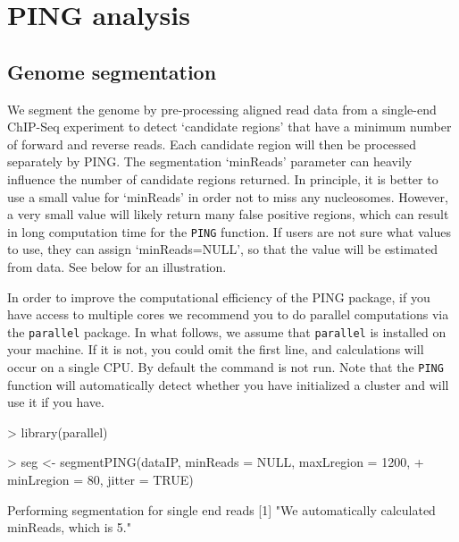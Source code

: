 \documentclass[11pt]{article}
\begin{document}
\section{PING analysis}

\subsection{Genome segmentation}
We segment the genome by pre-processing aligned read data from a single-end
ChIP-Seq experiment to detect `candidate regions' that have a minimum number of
forward and reverse reads. Each candidate region will then be processed
separately by PING. The segmentation `minReads' parameter can heavily influence
the number of candidate regions returned. In principle, it is better to use a
small value for `minReads' in order not to miss any nucleosomes. However, a very 
small value will likely return many false positive regions, which can result
in long computation time for the \texttt{PING} function. 
If users are not sure what values to use, they can assign `minReads=NULL', so
that the value will be estimated from data. See below for an illustration.

In order to improve the computational efficiency of the PING package, if you
have access to multiple cores we recommend you to do parallel computations via
the \texttt{parallel} package.
In what follows, we assume that \texttt{parallel} is installed on your machine.
If it is not, you could omit the first line, and calculations will occur on a
single CPU.
By default the command is not run. Note that the \texttt{PING} function will automatically detect whether you have initialized a
cluster and will use it if you have.

\begin{Schunk}
\begin{Sinput}
> library(parallel)
\end{Sinput}
\end{Schunk}


\begin{Schunk}
\begin{Sinput}
> seg <- segmentPING(dataIP, minReads = NULL, maxLregion = 1200, 
+     minLregion = 80, jitter = TRUE)
\end{Sinput}
\begin{Soutput}
Performing segmentation for single end reads
[1] "We automatically calculated minReads, which is 5."
\end{Soutput}
\end{Schunk}
\end{document}
